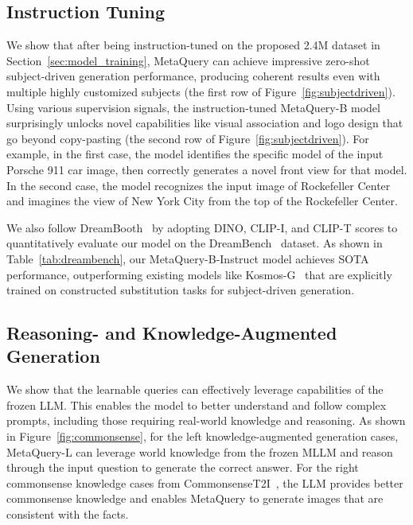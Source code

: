 \documentclass[]{fairmeta}
\newcommand\our{{\fontfamily{lmtt}\selectfont MetaQuery}\xspace}
\begin{document}
\subsection{Instruction Tuning}
\label{sec:subject_driven}
We show that after being instruction-tuned on the proposed 2.4M dataset in Section~\ref{sec:model_training}, \our can achieve impressive zero-shot subject-driven generation performance, producing coherent results even with multiple highly customized subjects (the first row of Figure~\ref{fig:subjectdriven}). Using various supervision signals, the instruction-tuned \our-B model surprisingly unlocks novel capabilities like visual association and logo design that go beyond copy-pasting (the second row of Figure~\ref{fig:subjectdriven}). For example, in the first case, the model identifies the specific model of the input Porsche 911 car image, then correctly generates a novel front view for that model. In the second case, the model recognizes the input image of Rockefeller Center and imagines the view of New York City from the top of the Rockefeller Center.

We also follow DreamBooth~\citep{dreambooth} by adopting DINO, CLIP-I, and CLIP-T scores to quantitatively evaluate our model on the DreamBench~\citep{dreambooth} dataset. As shown in Table~\ref{tab:dreambench}, our \our-B-Instruct model achieves SOTA performance, outperforming existing models like Kosmos-G~\citep{kosmosg} that are explicitly trained on constructed substitution tasks for subject-driven generation.

\subsection{Reasoning- and Knowledge-Augmented Generation}
\label{sec:reasoning_and_knowledge_augmented_generation}

We show that the learnable queries can effectively leverage capabilities of the frozen LLM. This enables the model to better understand and follow complex prompts, including those requiring real-world knowledge and reasoning. As shown in Figure~\ref{fig:commonsense}, for the left knowledge-augmented generation cases, \our-L can leverage world knowledge from the frozen MLLM and reason through the input question to generate the correct answer. For the right commonsense knowledge cases from CommonsenseT2I~\citep{commonsenset2i}, the LLM provides better commonsense knowledge and enables \our to generate images that are consistent with the facts.
\end{document}
